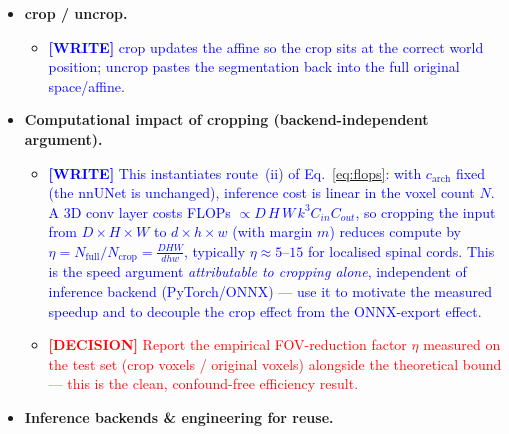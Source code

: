 \documentclass[11pt]{article}
\newcommand{\WRITE}[1]{\textcolor{blue}{\textbf{[WRITE]} #1}}
\newcommand{\DECISION}[1]{\textcolor{red}{\textbf{[DECISION]} #1}}
\begin{document}
\begin{itemize}
    \begin{itemize}
      \item \WRITE{Aggregate per-slice boxes to a 3D box in native LAS voxels;
            pad per face in mm (defaults sup=40, inf=100, L=R=15, ant=15,
            post=22; inferior is large to cover lumbar/anisotropic cords);
            clamp to image bounds; reorient box back to native orientation.}
      \item \WRITE{\texttt{check\_label\_crop} / \texttt{CropReport}: QC that no
            GT voxel is cut, reporting extra mm needed per face (how the
            defaults were tuned).}
    \end{itemize}
  \item \textbf{crop / uncrop.}
    \begin{itemize}
      \item \WRITE{crop updates the affine so the crop sits at the correct
            world position; uncrop pastes the segmentation back into the full
            original space/affine.}
    \end{itemize}
  \item \textbf{Computational impact of cropping (backend-independent argument).}
    \begin{itemize}
      \item \WRITE{This instantiates route~(ii) of Eq.~\eqref{eq:flops}: with
            $c_{\mathrm{arch}}$ fixed (the nnUNet is unchanged), inference cost is
            linear in the voxel count $N$. A 3D conv layer costs FLOPs
            $\propto D\,H\,W\,k^3 C_{in}C_{out}$, so cropping the input from
            $D\times H\times W$ to $d\times h\times w$ (with margin $m$) reduces
            compute by $\eta = N_{\mathrm{full}}/N_{\mathrm{crop}} =
            \frac{D H W}{d h w}$, typically $\eta\!\approx\!5$--$15$ for localised
            spinal cords. This is the speed argument \emph{attributable to cropping
            alone}, independent of inference backend (PyTorch/ONNX) --- use it to
            motivate the measured speedup and to decouple the crop effect from the
            ONNX-export effect.}
      \item \DECISION{Report the empirical FOV-reduction factor $\eta$ measured
            on the test set (crop voxels / original voxels) alongside the
            theoretical bound --- this is the clean, confound-free efficiency
            result.}
    \end{itemize}
  \item \textbf{Inference backends \& engineering for reuse.}

\end{itemize}
\end{document}
